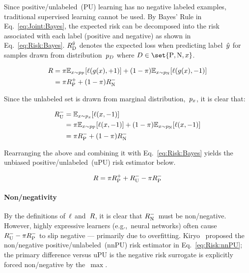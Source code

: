 Since positive\-/unlabeled~(PU) learning has no negative labeled examples, traditional supervised learning cannot be used. By Bayes' Rule in Eq.~\eqref{eq:Joint:Bayes}, the expected risk can be decomposed into the risk associated with each label (positive and negative) as shown in Eq.~\eqref{eq:Risk:Bayes}.  ${R_{\textnormal{D}}^{\hat{y}}}$ denotes the expected loss when predicting label~$\hat{y}$ for samples drawn from distribution~${p_{D}}$ where ${D \in \set{\textnormal{P}, \textnormal{N}, \X}}$.

\begin{align}
  R &= \pi \mathbb{E}_{x \sim p_{\textnormal{P}}}\lbrack\ell\mathopen{}\left(g\mathopen{}\left(x\right)\mathclose{},{+}1\right)\mathclose{}\rbrack + (1-\pi) \mathbb{E}_{x \sim p_{\textnormal{N}}}\lbrack\ell\mathopen{}\left(g\mathopen{}\left(x\right)\mathclose{},{-}1\right)\mathclose{}\rbrack \nonumber \\
        &= \pi R_{\textnormal{P}}^{{+}} + (1-\pi) R_{\textnormal{N}}^{{-}} \label{eq:Risk:Bayes}
\end{align}

Since the unlabeled set is drawn from marginal distribution,~$p_{x}$, it is clear that:

\begin{align}
  R_{\textnormal{U}}^{{-}} &= \mathbb{E}_{x \sim p_{x}} \lbrack\ell\mathopen{}\left(x,{-}1\right)\mathclose{}\rbrack \nonumber \\
            &= \pi \mathbb{E}_{x \sim p_{\textnormal{P}}} \lbrack\ell\mathopen{}\left(x,{-}1\right)\mathclose{}\rbrack + (1 - \pi) \mathbb{E}_{x \sim p_{\textnormal{N}}} \lbrack\ell\mathopen{}\left(x,{-}1\right)\mathclose{}\rbrack\nonumber \\
            &= \pi R_{\textnormal{P}}^{{-}} + (1 - \pi) R_{\textnormal{N}}^{{-}} \label{eq:Risk:Unlabeled}
\end{align}

\noindent
Rearranging the above and combining it with Eq.~\eqref{eq:Risk:Bayes} yields the unbiased positive\-/unlabeled~(uPU) risk estimator below.~\cite{duPlessis:2014}

\begin{equation}\label{eq:Risk:uPU}
  R = \pi R_{\textnormal{P}}^{{+}} + R_{\textnormal{U}}^{{-}} - \pi R_{\textnormal{P}}^{{-}}
\end{equation}

\paragraph{Non\-/negativity} By the definitions of~$\ell$ and~$R$, it is clear that $R_{\textnormal{N}}^{{-}}$~must be non\-/negative.  However, highly expressive learners (e.g.,~neural networks) often cause ${R_{\textnormal{U}}^{{-}} - \pi R_{\textnormal{P}}^{{-}}}$ to slip negative --- primarily due to overfitting.  Kiryo\etal~\cite{Kiryo:2017} proposed the non\-/negative positive\-/unlabeled~(nnPU) risk estimator in Eq.~\eqref{eq:Risk:nnPU}; the primary difference versus uPU is the negative risk surrogate is explicitly forced non\-/negative by the~$\max$.

